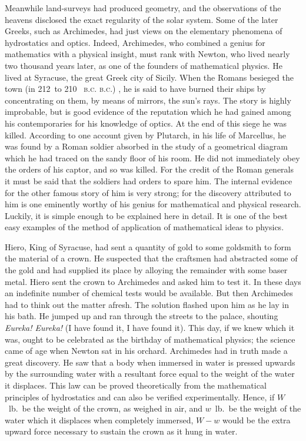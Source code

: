 \documentclass[12pt,leqno]{book}[2005/09/16]
\makeatletter
\newcommand{\PageSep}[1]{\ignorespaces}
\newcommand{\Foreign}[1]{\textit{#1}}
\newcommand{\SCAbbrev}[3]{%
  \ifthenelse{\equal{#3}{.}}%
  {\textsc{\MakeLowercase{#1.#2}.}}%
  {\textsc{\MakeLowercase{#1.#2}.}\@#3}%
}
\newcommand{\BC}[1]{\SCAbbrev{B}{C}{#1}}
\makeatother
\begin{document}
Meanwhile land-surveys had produced geometry,
%
\PageSep{37}
and the observations of the heavens
disclosed the exact regularity of the solar
system. Some of the later Greeks, such as
Archimedes, had just views on the elementary
%
phenomena of hydrostatics and optics. Indeed,
Archimedes, who combined a genius for
mathematics with a physical insight, must
rank with Newton, who lived nearly two
%
thousand years later, as one of the founders
of mathematical physics. He lived at Syracuse,
the great Greek city of Sicily. When
the Romans besieged the town (in 212~to
210~\BC), he is said to have burned their ships
by concentrating on them, by means of
mirrors, the sun's rays. The story is highly
improbable, but is good evidence of the reputation
which he had gained among his contemporaries
for his knowledge of optics. At
the end of this siege he was killed. According
to one account given by Plutarch, in his life of
%
Marcellus, he was found by a Roman soldier
%
absorbed in the study of a geometrical diagram
which he had traced on the sandy floor of his
room. He did not immediately obey the orders
of his captor, and so was killed. For the credit
of the Roman generals it must be said that
the soldiers had orders to spare him. The
internal evidence for the other famous story
of him is very strong; for the discovery
attributed to him is one eminently worthy of
his genius for mathematical and physical research.
\PageSep{38}
Luckily, it is simple enough to be
explained here in detail. It is one of the best
easy examples of the method of application
of mathematical ideas to physics.

Hiero, King of Syracuse, had sent a quantity
%
of gold to some goldsmith to form the
material of a crown. He suspected that the
craftsmen had abstracted some of the gold
and had supplied its place by alloying the
remainder with some baser metal. Hiero
sent the crown to Archimedes and asked him
to test it. In these days an indefinite number
of chemical tests would be available.
But then Archimedes had to think out the
matter afresh. The solution flashed upon
him as he lay in his bath. He jumped
up and ran through the streets to the
palace, shouting \Foreign{Eureka! Eureka!} (I have
found it, I have found it). This day, if we
knew which it was, ought to be celebrated as
the birthday of mathematical physics; the
science came of age when Newton sat in his
%
orchard. Archimedes had in truth made a
great discovery. He saw that a body when
immersed in water is pressed upwards by the
surrounding water with a resultant force
equal to the weight of the water it displaces.
This law can be proved theoretically from the
mathematical principles of hydrostatics and
can also be verified experimentally. Hence,
if $W$~lb.\ be the weight of the crown, as weighed
\PageSep{39}
in air, and $w$~lb.\ be the weight of the water
which it displaces when completely immersed,
$W - w$ would be the extra upward force
necessary to sustain the crown as it hung in
water.
\end{document}
